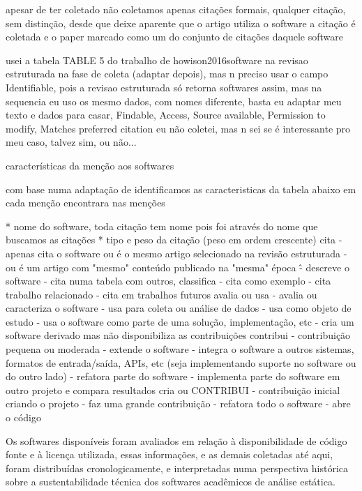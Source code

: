 apesar de ter coletado não coletamos apenas citações formais, qualquer citação,
sem distinção, desde que deixe aparente que o artigo utiliza o software a citação
é coletada e o paper marcado como um do conjunto de citações daquele software

usei a tabela TABLE 5 do trabalho de howison2016software na revisao estruturada
na fase de coleta (adaptar depois), mas n preciso usar o campo Identifiable, pois
a revisao estruturada só retorna softwares assim, mas na sequencia eu uso os
mesmo dados, com nomes diferente, basta eu adaptar meu texto e dados para casar,
Findable, Access, Source available, Permission to modify, Matches preferred citation eu
não coletei, mas n sei se é interessante pro meu caso, talvez sim, ou não...

características da menção aos softwares

com base numa adaptação de \cite{howison2016software} identificamos as caracteristicas
da tabela abaixo em cada menção encontrara nas menções

* nome do software, toda citação tem nome pois foi através do nome que buscamos as citações
* tipo e peso da citação (peso em ordem crescente)
cita
  - apenas cita o software ou é o mesmo artigo selecionado na revisão estruturada
  - ou é um artigo com "mesmo" conteúdo publicado na "mesma" época \^
  - descreve o software
  - cita numa tabela com outros, classifica
  - cita como exemplo
  - cita trabalho relacionado
  - cita em trabalhos futuros
avalia ou usa
  - avalia ou caracteriza o software
  - usa para coleta ou análise de dados
  - usa como objeto de estudo
  - usa o software como parte de uma solução, implementação, etc
  - cria um software derivado mas não disponibiliza as contribuições
contribui
  - contribuição pequena ou moderada
  - extende o software
  - integra o software a outros sistemas, formatos de entrada/saída, APIs, etc
    (seja implementando suporte no software ou do outro lado)
  - refatora parte do software
  - implementa parte do software em outro projeto e compara resultados
cria ou CONTRIBUI
  - contribuição inicial criando o projeto
  - faz uma grande contribuição
  - refatora todo o software
  - abre o código

Os softwares disponíveis foram avaliados em relação à disponibilidade de código
fonte e à licença utilizada, essas informações, e as demais coletadas até aqui,
foram distribuídas cronologicamente, e interpretadas numa perspectiva histórica
sobre a sustentabilidade técnica dos softwares acadêmicos de análise estática.

